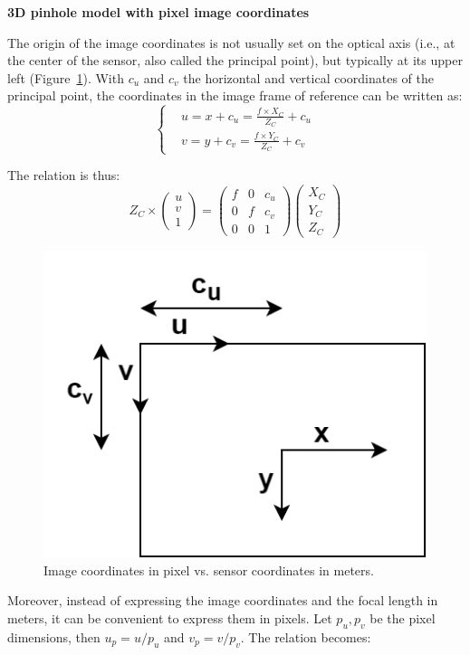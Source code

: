 \noindent\textbf{3D pinhole model with pixel image coordinates}

The origin of the image coordinates is not usually set on the optical axis (i.e., at the center of the sensor, also called the principal point), but typically at its upper left (Figure~\ref{fig_imagecoord}). With $c_u$ and $c_v$ the horizontal and vertical coordinates of the principal point, the coordinates in the image frame of reference can be written as: 
\begin{equation}
  \begin{cases}
    &u = x + c_u = \frac{f\times X_C}{Z_C} + c_u\\
    &v = y + c_v = \frac{f\times Y_C}{Z_C} + c_v
  \end{cases}
\end{equation}

The relation is thus:
\begin{equation}
    Z_C \times \begin{pmatrix}u\\v\\1\end{pmatrix} = \begin{pmatrix}f & 0 &c_u \\0 & f & c_v\\0&0&1\end{pmatrix}\begin{pmatrix}X_C\\Y_C\\Z_C\end{pmatrix}
\end{equation}

\begin{figure}[hbtp]
	\centering
	\def\svgwidth{\columnwidth}
	\fontsize{10pt}{10pt}\selectfont
	\includegraphics[width=0.3\linewidth]{"../Chap2/Figures/Image_Coord.png"}
	\caption{Image coordinates in pixel vs. sensor coordinates in meters.} 
	\label{fig_imagecoord}
\end{figure}

Moreover, instead of expressing the image coordinates and the focal length in meters, it can be convenient to express them in pixels. Let \(p_u, p_v\) be the pixel dimensions, then \(u_p = u/p_u\) and \(v_p = v/p_v\). The relation becomes:


